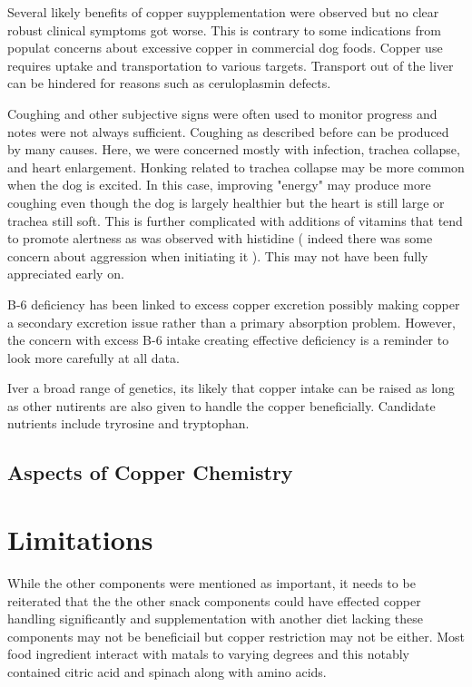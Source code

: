 Several likely benefits of copper suypplementation were observed
but no clear robust clinical symptoms got worse.
This is contrary to some indications from populat concerns
about excessive copper in commercial dog foods. 
Copper use requires uptake and transportation to 
various targets. Transport out of the liver can be hindered
for reasons such as ceruloplasmin defects.

Coughing and other subjective signs were often used
to monitor progress and notes were not always sufficient.
Coughing as described before can be produced by many
causes. Here, we were concerned mostly with infection,
trachea collapse, and heart enlargement. Honking
related to trachea collapse may be more common when the
dog is excited. In this case, improving "energy" may
produce more coughing even though the dog is largely
healthier but the heart is still large or trachea
still soft. This is further complicated with additions
of vitamins that tend to promote alertness as was 
observed with histidine ( indeed there was some concern
about aggression when initiating it ). This may not
have been fully appreciated early on.  


B-6 deficiency has been linked to excess copper excretion \cite{PMID7814236}
possibly making copper a secondary excretion issue
rather than a primary absorption problem. 
However, the concern with excess B-6 intake creating effective
deficiency is a reminder to look more carefully at all data. 


Iver a broad range of genetics, its likely that copper intake
can be raised as long as other nutirents are also given
to handle the copper beneficially.
Candidate nutrients include tryrosine and tryptophan.

\subsection{Aspects of Copper Chemistry  }

\section{Limitations}
While the other components were mentioned as important,
it needs to be reiterated that the 
the other snack components could have effected copper handling
significantly and supplementation with another diet lacking
these components may not be beneficiail but copper restriction
may not be either. Most food ingredient interact with matals 
to varying degrees and this notably contained citric acid
and spinach along with amino acids. 

